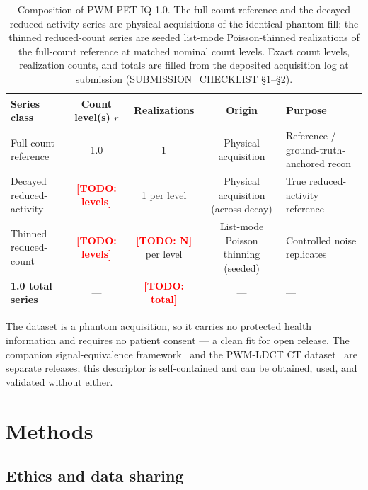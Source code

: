\documentclass[twoside,11pt]{article}
\newcommand{\todo}[1]{\textcolor{red}{\textbf{[TODO: #1]}}}
\begin{document}
\begin{table}[ht]
    \centering
    \small
    \setlength{\tabcolsep}{4pt}
    \begin{tabularx}{\textwidth}{@{}>{\raggedright\arraybackslash}X c c c >{\raggedright\arraybackslash}X@{}}
        \toprule
        \textbf{Series class} & \textbf{Count level(s) $r$} & \textbf{Realizations} & \textbf{Origin} & \textbf{Purpose} \\
        \midrule
        Full-count reference       & 1.0                     & 1              & Physical acquisition & Reference / ground-truth-anchored recon \\
        Decayed reduced-activity   & \todo{levels}           & 1 per level    & Physical acquisition (across decay) & True reduced-activity reference \\
        Thinned reduced-count      & \todo{levels}           & \todo{N} per level & List-mode Poisson thinning (seeded) & Controlled noise replicates \\
        \midrule
        \textbf{1.0 total series}  & ---                     & \textbf{\todo{total}} & --- & --- \\
        \bottomrule
    \end{tabularx}
    \caption{Composition of PWM-PET-IQ 1.0. The full-count reference and the
    decayed reduced-activity series are physical acquisitions of the identical
    phantom fill; the thinned reduced-count series are seeded list-mode
    Poisson-thinned realizations of the full-count reference at matched nominal
    count levels. Exact count levels, realization counts, and totals are filled
    from the deposited acquisition log at submission (SUBMISSION\_CHECKLIST \S1--\S2).}
    \label{tab:series_overview}
\end{table}

The dataset is a phantom acquisition, so it carries no protected health
information and requires no patient consent --- a clean fit for open release. The
companion signal-equivalence framework~\citep{ws2framework} and the PWM-LDCT CT
dataset~\citep{ws1dataset} are separate releases; this descriptor is
self-contained and can be obtained, used, and validated without either.

\section*{Methods}

\subsection*{Ethics and data sharing}
\end{document}
